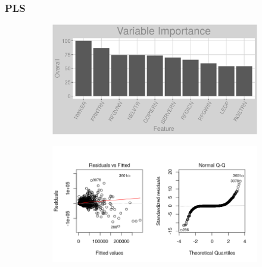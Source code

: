 \subsubsection{PLS}
\label{appendix:electricity:pls}
\begin{figure}[h]
\centering
\begin{subfigure}{1\textwidth}
\centering
\includegraphics[width=.99\textwidth, height=0.3\textheight]{Images/electricity_pls_vars.png}
\end{subfigure}
\begin{subfigure}{1\textwidth}
\centering
\includegraphics[width=.99\textwidth, height=0.475\textheight]{Images/electricity_pls_res_1.png}
\end{subfigure}
\end{figure}
\FloatBarrier
\newpage
